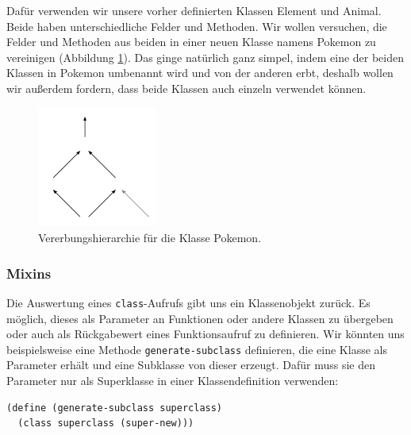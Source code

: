 Dafür verwenden wir unsere vorher definierten Klassen Element und Animal. Beide haben unterschiedliche Felder und Methoden. Wir wollen versuchen, die Felder und Methoden aus beiden in einer neuen Klasse namens Pokemon zu vereinigen (Abbildung \ref{hirarchy}). Das ginge natürlich ganz simpel, indem eine der beiden Klassen in Pokemon umbenannt wird und von der anderen erbt, deshalb wollen wir außerdem fordern, dass beide Klassen auch einzeln verwendet können. 

\begin{figure}[h]
 \centering
 \includegraphics[width=0.35\textwidth]{pictures/hirarchy}
 \caption{Vererbungshierarchie für die Klasse Pokemon.}
 \label{hirarchy}
\end{figure}


\subsubsection{Mixins}
Die Auswertung eines \texttt{class}-Aufrufs gibt uns ein Klassenobjekt zurück. Es möglich, dieses als Parameter an Funktionen oder andere Klassen zu übergeben oder auch als Rückgabewert eines Funktionsaufruf zu definieren. Wir könnten uns beispielsweise eine Methode \texttt{generate-subclass} definieren, die eine Klasse als Parameter erhält und eine Subklasse von dieser erzeugt. Dafür muss sie den Parameter nur als Superklasse in einer Klassendefinition verwenden:

\begin{lstlisting}
(define (generate-subclass superclass)
  (class superclass (super-new)))
\end{lstlisting} 

